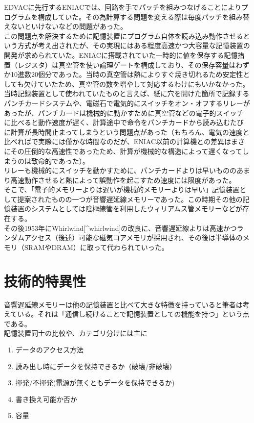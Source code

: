 EDVACに先行するENIACでは、回路を手でパッチを組みつなげることによりプログラムを構成していた。その為計算する問題を変える際は毎度パッチを組み替えないといけないなどの問題があった。\\
この問題点を解決するために記憶装置にプログラム自体を読み込み動作させるという方式が考え出されたが、その実現にはある程度高速かつ大容量な記憶装置の開発が求められていた。ENIACに搭載されていた一時的に値を保存する記憶措置（レジスタ）は真空管を使い論理ゲートを構成しており、その保存容量はわずか10進数20個分であった。当時の真空管は熱によりすぐ焼き切れるため安定性としても欠けていたため、真空管の数を増やして対応するわけにもいかなかった。\\
当時記録装置として使われていたものと言えば、紙に穴を開けた箇所で記録するパンチカードシステムや、電磁石で電気的にスイッチをオン・オフするリレーがあったが、パンチカードは機械的に動かすために真空管などの電子的スイッチに比べると動作速度が遅く、計算途中で命令をパンチカードから読み込むたびに計算が長時間止まってしまうという問題点があった（もちろん、電気の速度と比べればで実際には僅かな時間なのだが、ENIAC以前の計算機との差異はまさにその圧倒的な高速性であったため、計算が機械的な構造によって遅くなってしまうのは致命的であった）。\\
リレーも機械的にスイッチを動かすために、パンチカードよりは早いもののあまり高速動作させると熱によって誤動作を起こすため速度には限度があった。\\
そこで、「電子的メモリーよりは遅いが機械的メモリーよりは早い」記憶装置として提案されたものの一つが音響遅延線メモリーであった。この時期その他の記憶装置のシステムとしては陰極線管を利用したウィリアムス管メモリーなどが存在する\autocite{invent_computer}。\\
その後1953年にWhirlwind{[}\^{}whirlwind{]}の改良に、音響遅延線よりは高速かつランダムアクセス（後述）可能な磁気コアメモリが採用され、その後は半導体のメモリ（SRAMやDRAM）に取って代わられていった。

\section{技術的特異性}\label{ux6280ux8853ux7684ux7279ux7570ux6027}

音響遅延線メモリーは他の記憶装置と比べて大きな特徴を持っていると筆者は考えている。それは「通信し続けることで記憶装置としての機能を持つ」という点である。\\
記憶装置同士の比較や、カテゴリ分けには主に

\begin{enumerate}
\def\labelenumi{\arabic{enumi}.}
\tightlist
\item
  データのアクセス方法
\item
  読み出し時にデータを保持できるか（破壊/非破壊）
\item
  揮発/不揮発(電源が無くともデータを保持できるか)
\item
  書き換え可能か否か
\item
  容量
\end{enumerate}

